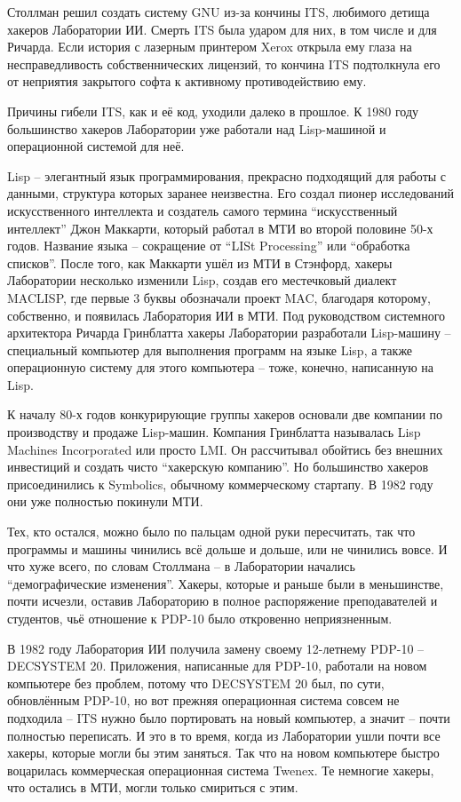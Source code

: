 Столлман решил создать систему GNU из-за кончины ITS, любимого детища хакеров Лаборатории ИИ. Смерть ITS была ударом для них, в том числе и для Ричарда. Если история с лазерным принтером Xerox открыла ему глаза на несправедливость собственнических лицензий, то кончина ITS подтолкнула его от неприятия закрытого софта к активному противодействию ему.

Причины гибели ITS, как и её код, уходили далеко в прошлое. К 1980 году большинство хакеров Лаборатории уже работали над Lisp-машиной и операционной системой для неё.

Lisp -- элегантный язык программирования, прекрасно подходящий для работы с данными, структура которых заранее неизвестна. Его создал пионер исследований искусственного интеллекта и создатель самого термина \enquote{искусственный интеллект} Джон Маккарти, который работал в МТИ во второй половине 50-х годов. Название языка -- сокращение от \enquote{LISt Processing} или \enquote{обработка списков}. После того, как Маккарти ушёл из МТИ в Стэнфорд, хакеры Лаборатории несколько изменили Lisp, создав его местечковый диалект MACLISP, где первые 3 буквы обозначали проект MAC, благодаря которому, собственно, и появилась Лаборатория ИИ в МТИ. Под руководством системного архитектора Ричарда Гринблатта хакеры Лаборатории разработали Lisp-машину -- специальный компьютер для выполнения программ на языке Lisp, а также операционную систему для этого компьютера -- тоже, конечно, написанную на Lisp.

К началу 80-х годов конкурирующие группы хакеров основали две компании по производству и продаже Lisp-машин. Компания Гринблатта называлась Lisp Machines Incorporated или просто LMI. Он рассчитывал обойтись без внешних инвестиций и создать чисто \enquote{хакерскую компанию}. Но большинство хакеров присоединились к Symbolics, обычному коммерческому стартапу. В 1982 году они уже полностью покинули МТИ.

Тех, кто остался, можно было по пальцам одной руки пересчитать, так что программы и машины чинились всё дольше и дольше, или не чинились вовсе. И что хуже всего, по словам Столлмана -- в Лаборатории начались \enquote{демографические изменения}. Хакеры, которые и раньше были в меньшинстве, почти исчезли, оставив Лабораторию в полное распоряжение преподавателей и студентов, чьё отношение к PDP-10 было откровенно неприязненным.

В 1982 году Лаборатория ИИ получила замену своему 12-летнему PDP-10 -- DECSYSTEM 20. Приложения, написанные для PDP-10, работали на новом компьютере без проблем, потому что DECSYSTEM 20 был, по сути, обновлённым PDP-10, но вот прежняя операционная система совсем не подходила -- ITS нужно было портировать на новый компьютер, а значит -- почти полностью переписать. И это в то время, когда из Лаборатории ушли почти все хакеры, которые могли бы этим заняться. Так что на новом компьютере быстро воцарилась коммерческая операционная система Twenex. Те немногие хакеры, что остались в МТИ, могли только смириться с этим.

